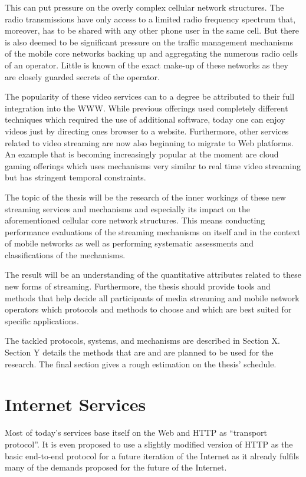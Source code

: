 This can put pressure on the overly complex cellular network structures. The radio transmissions have only access to a limited radio frequency spectrum that, moreover, has to be shared with any other phone user in the same cell. But there is also deemed to be significant pressure on the traffic management mechanisms of the mobile core networks backing up and aggregating the numerous radio cells of an operator. Little is known of the exact make-up of these networks as they are closely guarded secrets of the operator.

The popularity of these video services can to a degree be attributed to their full integration into the WWW. While previous offerings used completely different techniques which required the use of additional software, today one can enjoy videos just by directing ones browser to a website. Furthermore, other services related to video streaming are now also beginning to migrate to Web platforms. An example that is becoming increasingly popular at the moment are cloud gaming offerings which uses mechanisms very similar to real time video streaming but has stringent temporal constraints.


The topic of the thesis will be the research of the inner workings of these new streaming services and mechanisms and especially its impact on the aforementioned cellular core network structures. This means conducting performance evaluations of the streaming mechanisms on itself and in the context of mobile networks as well as performing systematic assessments and classifications of the mechanisms. 

The result will be an understanding of the quantitative attributes related to these new forms of streaming. Furthermore, the thesis should provide tools and methods that help decide all participants of media streaming and mobile network operators which protocols and methods to choose and which are best suited for specific applications.

The tackled protocols, systems, and mechanisms are described in Section X. Section Y details the methods that are and are planned to be used for the research. The final section gives a rough estimation on the thesis' schedule.


\section{Internet Services}


Most of today's services base itself on the Web and HTTP as ``transport protocol''. It is even proposed to use
a slightly modified version of HTTP as the basic end-to-end protocol for a future iteration of the Internet\cite{Popa:2010:HNW:1868447.1868453} as it already fulfils many of the demands proposed for the future of the Internet.



